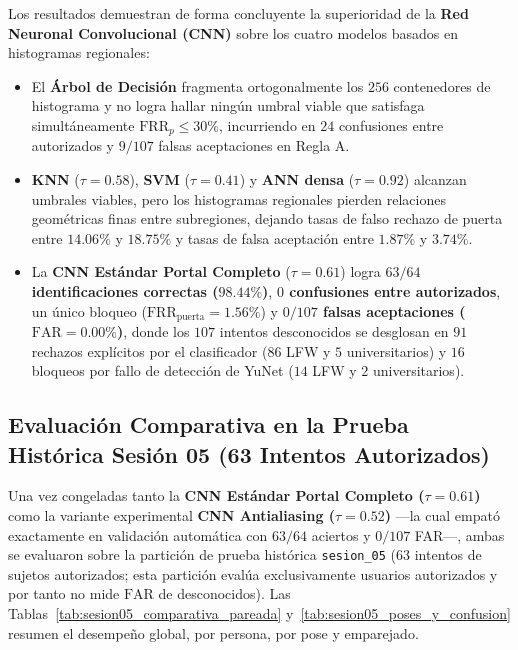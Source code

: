 \documentclass{article}
\begin{document}
Los resultados demuestran de forma concluyente la superioridad de la \textbf{Red Neuronal Convolucional (CNN)} sobre los cuatro modelos basados en histogramas regionales:
\begin{itemize}
    \item El \textbf{Árbol de Decisión} fragmenta ortogonalmente los $256$ contenedores de histograma y no logra hallar ningún umbral viable que satisfaga simultáneamente $\text{FRR}_p \le 30\%$, incurriendo en $24$ confusiones entre autorizados y $9/107$ falsas aceptaciones en Regla A.
    \item \textbf{KNN} ($\tau = 0.58$), \textbf{SVM} ($\tau = 0.41$) y \textbf{ANN densa} ($\tau = 0.92$) alcanzan umbrales viables, pero los histogramas regionales pierden relaciones geométricas finas entre subregiones, dejando tasas de falso rechazo de puerta entre $14.06\%$ y $18.75\%$ y tasas de falsa aceptación entre $1.87\%$ y $3.74\%$.
    \item La \textbf{CNN Estándar Portal Completo} ($\tau = 0.61$) logra \textbf{$63/64$ identificaciones correctas ($98.44\%$)}, \textbf{$0$ confusiones entre autorizados}, un único bloqueo ($\text{FRR}_{\text{puerta}} = 1.56\%$) y \textbf{$0/107$ falsas aceptaciones ($\text{FAR} = 0.00\%$)}, donde los $107$ intentos desconocidos se desglosan en $91$ rechazos explícitos por el clasificador ($86$ LFW y $5$ universitarios) y $16$ bloqueos por fallo de detección de YuNet ($14$ LFW y $2$ universitarios).
\end{itemize}

\subsection{Evaluación Comparativa en la Prueba Histórica Sesión 05 (63 Intentos Autorizados)}
Una vez congeladas tanto la \textbf{CNN Estándar Portal Completo ($\tau = 0.61$)} como la variante experimental \textbf{CNN Antialiasing ($\tau = 0.52$)} ---la cual empató exactamente en validación automática con $63/64$ aciertos y $0/107$ FAR---, ambas se evaluaron sobre la partición de prueba histórica \texttt{sesion\_05} ($63$ intentos de sujetos autorizados; esta partición evalúa exclusivamente usuarios autorizados y por tanto no mide $\text{FAR}$ de desconocidos). Las Tablas~\ref{tab:sesion05_comparativa_pareada} y~\ref{tab:sesion05_poses_y_confusion} resumen el desempeño global, por persona, por pose y emparejado.
\end{document}
